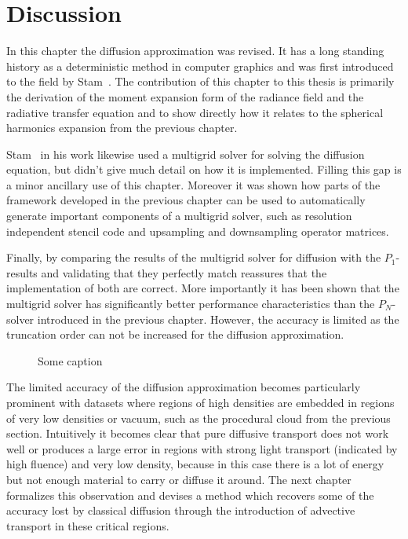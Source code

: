\section{Discussion}
\label{sec:da_discussion}

In this chapter the diffusion approximation was revised. It has a long standing history as a deterministic method in computer graphics and was first introduced to the field by Stam~\cite{Stam95}. The contribution of this chapter to this thesis is primarily the derivation of the moment expansion form of the radiance field and the radiative transfer equation and to show directly how it relates to the spherical harmonics expansion from the previous chapter.

Stam~\cite{Stam95} in his work likewise used a multigrid solver for solving the diffusion equation, but didn't give much detail on how it is implemented. Filling this gap is a minor ancillary use of this chapter. Moreover it was shown how parts of the framework developed in the previous chapter can be used to automatically generate important components of a multigrid solver, such as resolution independent stencil code and upsampling and downsampling operator matrices.

Finally, by comparing the results of the multigrid solver for diffusion with the $P_1$-results and validating that they perfectly match reassures that the implementation of both are correct. More importantly it has been shown that the multigrid solver has significantly better performance characteristics than the $P_N$-solver introduced in the previous chapter. However, the accuracy is limited as the truncation order can not be increased for the diffusion approximation.

\begin{figure}[h]
\centering
{}
\caption{Some caption}
\label{fig:da_results_multigrid_for_pn}
\end{figure}

The limited accuracy of the diffusion approximation becomes particularly prominent with datasets where regions of high densities are embedded in regions of very low densities or vacuum, such as the procedural cloud from the previous section. Intuitively it becomes clear that pure diffusive transport does not work well or produces a large error in regions with strong light transport (indicated by high fluence) and very low density, because in this case there is a lot of energy but not enough material to carry or diffuse it around. The next chapter formalizes this observation and devises a method which recovers some of the accuracy lost by classical diffusion through the introduction of advective transport in these critical regions.